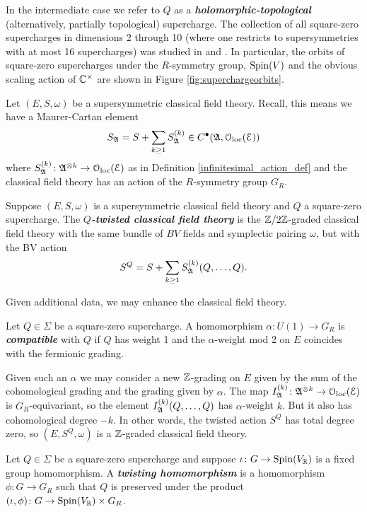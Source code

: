 \documentclass[10pt, oneside]{article}
\newcommand{\defterm}[1]{\textbf{\emph{#1}}}
\begin{document}
In the intermediate case we refer to $Q$ as a \defterm{holomorphic-topological} (alternatively, partially topological) supercharge. The collection of all square-zero supercharges in dimensions 2 through 10 (where one restricts to supersymmetries with at most 16 supercharges) was studied in \cite{ElliottSafronov} and \cite{EagerSaberiWalcher}. In particular, the orbits of square-zero supercharges under the $R$-symmetry group, $\mathrm{Spin}(V)$ and the obvious scaling action of $\mathbb C^\times$ are shown in Figure \ref{fig:superchargeorbits}.

Let $(E, S, \omega)$ be a supersymmetric classical field theory. Recall, this means we have a Maurer-Cartan element 
\[
S_{\mathfrak A} = S + \sum_{k \geq 1} S_{\mathfrak A}^{(k)} \in C^\bullet(\mathfrak A, \mathcal{O}_{\rm loc}(\mathcal E))
\]
where $S_{\mathfrak A}^{(k)}\colon \mathfrak A^{\otimes k} \to \mathcal{O}_{\rm loc}(\mathcal E)$ as in Definition \ref{infinitesimal_action_def} and the classical field theory has an action of the $R$-symmetry group $G_R$.

\begin{definition} \label{def:twisting}
Suppose $(E, S, \omega)$ is a supersymmetric classical field theory and $Q$ a square-zero supercharge. The \defterm{$Q$-twisted classical field theory} is the $\mathbb Z/2\mathbb Z$-graded classical field theory with the same bundle of $BV$ fields and symplectic pairing $\omega$, but with the BV action
\[S^Q = S + \sum_{k \geq 1} S_{\mathfrak A}^{(k)}(Q, \dots, Q).\]
\end{definition}

Given additional data, we may enhance the classical field theory.

\begin{definition}
Let $Q\in\Sigma$ be a square-zero supercharge. A homomorphism $\alpha\colon U(1)\rightarrow G_R$ is \defterm{compatible} with $Q$ if $Q$ has weight 1 and the $\alpha$-weight mod 2 on $E$ coincides with the fermionic grading.
\end{definition}

Given such an $\alpha$ we may consider a new $\mathbb Z$-grading on $E$ given by the sum of the cohomological grading and the grading given by $\alpha$. The map $I_{\mathfrak A}^{(k)}\colon \mathfrak A^{\otimes k} \to \mathcal{O}_{\rm loc}(\mathcal E)$ is $G_R$-equivariant, so the element $I_{\mathfrak A}^{(k)}(Q, \dots, Q)$ has $\alpha$-weight $k$. But it also has cohomological degree $-k$. In other words, the twisted action $S^Q$ has total degree zero, so $(E, S^Q, \omega)$ is a $\mathbb Z$-graded classical field theory.

\begin{definition}
Let $Q\in\Sigma$ be a square-zero supercharge and suppose $\iota \colon G\rightarrow \mathrm{Spin}(V_\mathbb R)$ is a fixed group homomorphism. A \defterm{twisting homomorphism} is a homomorphism $\phi\colon G\rightarrow G_R$ such that $Q$ is preserved under the product $(\iota, \phi) \colon G\rightarrow \mathrm{Spin}(V_\mathbb R)\times G_R$.
\end{definition}
\end{document}
